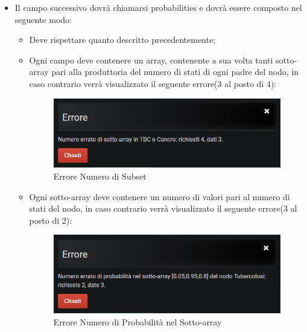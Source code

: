 \begin{itemize}
\begin{itemize}
	\end{itemize}
	
	\item Il campo successivo dovrà chiamarsi probabilities e dovrà essere composto nel seguente modo:
	
	\begin{itemize}
		\item Deve rispettare quanto descritto precedentemente;
		\item Ogni campo deve contenere un array, contenente a sua volta tanti sotto-array pari alla produttoria del numero di stati di ogni padre del nodo, in caso contrario verrà visualizzato il seguente errore(3 al posto di 4):
		
		\begin{figure}[H]
	\begin{center}
		\includegraphics[scale=0.8]{./images/wrongSubsets.png}
		 \caption{Errore Numero di Subset}	
		 \label{erWrongSubsets}
	\end{center}
	\end{figure}	
		
		\item Ogni sotto-array deve contenere un numero di valori pari al numero di stati del nodo, in caso contrario verrà visualizzato il seguente errore(3 al posto di 2): 
		
		\begin{figure}[H]
	\begin{center}
		\includegraphics[scale=0.8]{./images/numberProbs.png}
		 \caption{Errore Numero di Probabilità nel Sotto-array}	
		 \label{erWrongSubsetsSottoArray}
	\end{center}
	\end{figure}	
	

\end{itemize}
\end{itemize}
